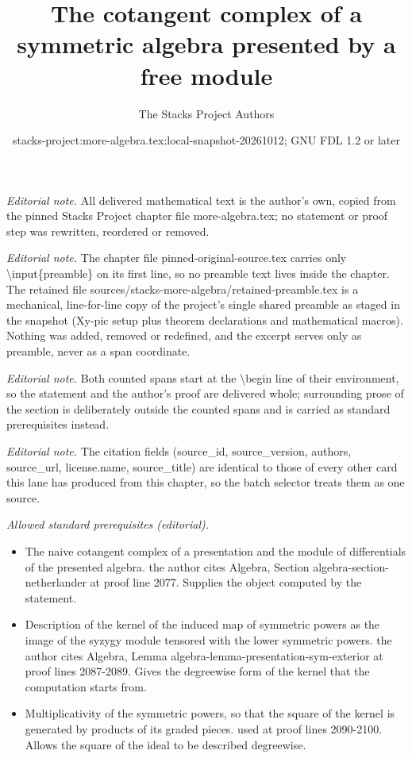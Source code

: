 \documentclass[10pt,a4paper]{amsart}
\title{The cotangent complex of a symmetric algebra presented by a free module}
\author{The Stacks Project Authors}
\date{stacks-project:more-algebra.tex:local-snapshot-20261012; GNU FDL 1.2 or later}
\theoremstyle{plain}
\theoremstyle{definition}
\theoremstyle{remark}
\numberwithin{equation}{subsection}
\begin{document}
\maketitle
\setcounter{subsection}{1}
\noindent\textit{Editorial note.} All delivered mathematical text is the author's own, copied from the pinned Stacks Project chapter file more-algebra.tex; no statement or proof step was rewritten, reordered or removed.\par\medskip
\noindent\textit{Editorial note.} The chapter file pinned-original-source.tex carries only \textbackslash{}input\{preamble\} on its first line, so no preamble text lives inside the chapter. The retained file sources/stacks-more-algebra/retained-preamble.tex is a mechanical, line-for-line copy of the project's single shared preamble as staged in the snapshot (Xy-pic setup plus theorem declarations and mathematical macros). Nothing was added, removed or redefined, and the excerpt serves only as preamble, never as a span coordinate.\par\medskip
\noindent\textit{Editorial note.} Both counted spans start at the \textbackslash{}begin line of their environment, so the statement and the author's proof are delivered whole; surrounding prose of the section is deliberately outside the counted spans and is carried as standard prerequisites instead.\par\medskip
\noindent\textit{Editorial note.} The citation fields (source\_id, source\_version, authors, source\_url, license.name, source\_title) are identical to those of every other card this lane has produced from this chapter, so the batch selector treats them as one source.\par\medskip
\noindent\textit{Allowed standard prerequisites (editorial).}\begin{itemize}
\item The naive cotangent complex of a presentation and the module of differentials of the presented algebra. the author cites Algebra, Section algebra-section-netherlander at proof line 2077. Supplies the object computed by the statement.
\item Description of the kernel of the induced map of symmetric powers as the image of the syzygy module tensored with the lower symmetric powers. the author cites Algebra, Lemma algebra-lemma-presentation-sym-exterior at proof lines 2087-2089. Gives the degreewise form of the kernel that the computation starts from.
\item Multiplicativity of the symmetric powers, so that the square of the kernel is generated by products of its graded pieces. used at proof lines 2090-2100. Allows the square of the ideal to be described degreewise.
\end{itemize}\medskip
\end{document}
